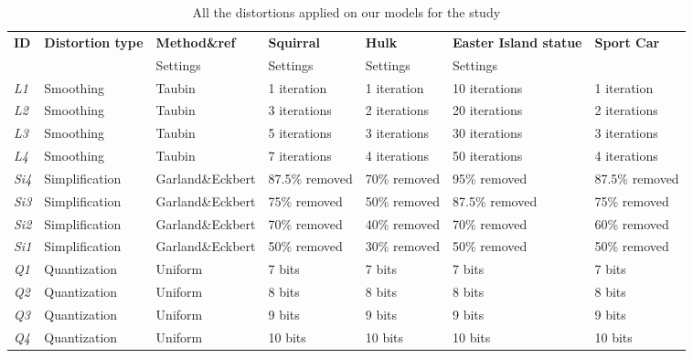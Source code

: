 \begin{table}[]
\centering
\caption{All the distortions applied on our models for the study}
\label{my-label}
\begin{tabular}{lllllll}
\textbf{ID} & \textbf{Distortion type} & \textbf{Method\&ref}        & \textbf{Squirral }      & \textbf{Hulk }        & \textbf{Easter Island statue} & \textbf{Sport Car }    \\
                &                        & Settings       & Settings     & Settings             & Settings       \\
\textit{L1} & Smoothing       & Taubin              & 1 iteration    & 1 iteration  & 10 iterations        & 1 iteration    \\
\textit{L2} & Smoothing       & Taubin              & 3 iterations   & 2 iterations & 20 iterations        & 2 iterations   \\
\textit{L3} & Smoothing       & Taubin              & 5 iterations   & 3 iterations & 30 iterations        & 3 iterations   \\
\textit{L4} & Smoothing       & Taubin              & 7 iterations   & 4 iterations & 50 iterations        & 4 iterations   \\
\textit{Si4} & Simplification  & Garland\&Eckbert \cite{Garland_1997}       & 87.5\% removed & 70\% removed & 95\% removed         & 87.5\% removed \\
\textit{Si3} & Simplification  & Garland\&Eckbert \cite{Garland_1997}       & 75\% removed   & 50\% removed & 87.5\% removed       & 75\% removed   \\
\textit{Si2} & Simplification  & Garland\&Eckbert \cite{Garland_1997}        & 70\% removed   & 40\% removed & 70\% removed         & 60\% removed   \\
\textit{Si1} & Simplification  & Garland\&Eckbert \cite{Garland_1997}       & 50\% removed   & 30\% removed & 50\% removed         & 50\% removed   \\
\textit{Q1 }& Quantization    & Uniform                & 7 bits         & 7 bits       & 7 bits               & 7 bits         \\
\textit{Q2} & Quantization    & Uniform                & 8 bits         & 8 bits       & 8 bits               & 8 bits         \\
\textit{Q3} & Quantization    & Uniform                & 9 bits         & 9 bits       & 9 bits               & 9 bits         \\
\textit{Q4} & Quantization    & Uniform                & 10 bits        & 10 bits      & 10 bits              & 10 bits        \\

\end{tabular}
\end{table}
